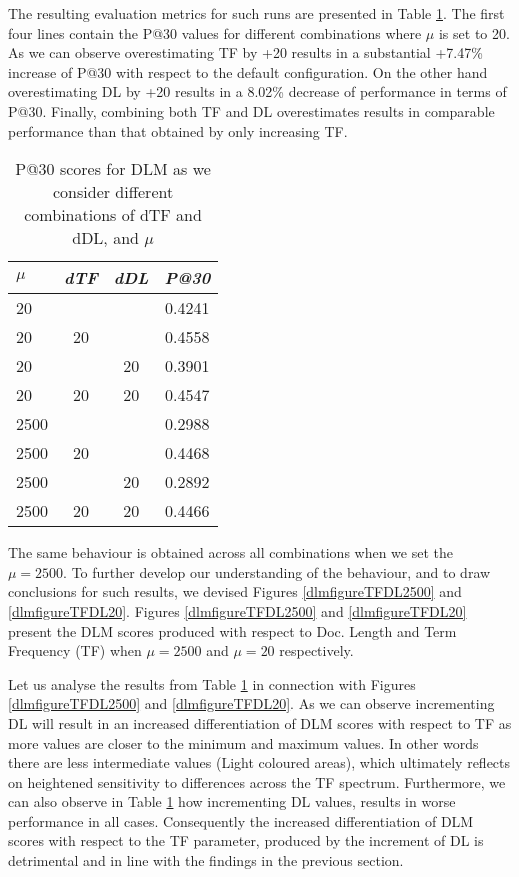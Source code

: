 The resulting evaluation metrics for such runs are presented in Table \ref{drmdtfmuvalues}. The first four lines contain the P@30 values for different combinations where $\mu$ is set to 20. As we can observe overestimating TF by +20 results in a substantial +7.47\% increase of P@30 with respect to the default configuration. On the other hand overestimating DL by +20 results in a 8.02\% decrease of performance in terms of P@30. Finally, combining both TF and DL overestimates results in comparable performance than that obtained by only increasing TF.

\begin{table}[]
	\caption{P@30 scores for DLM as we consider different combinations of dTF and dDL, and $\mu$}
	\centering
	\begin{tabular}{l|c|c|c} 	
	\textit{\textbf{$\mu$}} & 
	\textit{\textbf{dTF}} & 
	\textit{\textbf{dDL}} & 
	\textit{\textbf{P@30}} 	
	\tabularnewline
	\hline
	20 &    &    & 0.4241\\
	20 & 20 &    & 0.4558\\
	20 &    & 20 & 0.3901\\
	20 & 20 & 20 & 0.4547\\
	\hline	
	\hline
	2500 &    &    & 0.2988\\
	2500 & 20 &    & 0.4468\\
	2500 &    & 20 & 0.2892\\
	2500 & 20 & 20 & 0.4466\\
    \hline
	\end{tabular}
	\label{drmdtfmuvalues}
\end{table}

The same behaviour is obtained across all combinations when we set the $\mu = 2500$. To further develop our understanding of the behaviour, and to draw conclusions for such results, we devised Figures \ref{dlmfigureTFDL2500} and \ref{dlmfigureTFDL20}. Figures \ref{dlmfigureTFDL2500} and \ref{dlmfigureTFDL20} present the DLM scores produced with respect to Doc. Length and Term Frequency (TF) when $\mu=2500$ and $\mu=20$ respectively.

Let us analyse the results from Table \ref{drmdtfmuvalues} in connection with Figures \ref{dlmfigureTFDL2500} and \ref{dlmfigureTFDL20}. As we can observe incrementing DL will result in an increased differentiation of DLM scores with respect to TF as more values are closer to the minimum and maximum values. In other words there are less intermediate values (Light coloured areas), which ultimately reflects on heightened sensitivity to differences across the TF spectrum. Furthermore, we can also observe in Table \ref{drmdtfmuvalues} how incrementing DL values, results in worse performance in all cases. Consequently the increased differentiation of DLM scores with respect to the TF parameter, produced by the increment of DL is detrimental and in line with the findings in the previous section.

